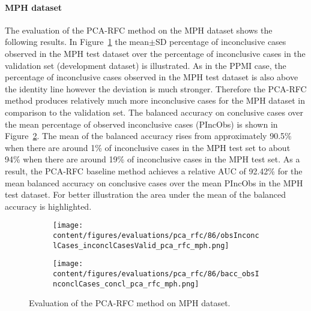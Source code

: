 
\paragraph{MPH dataset}

The evaluation of the PCA-RFC method on the MPH dataset shows the following results.
In Figure~\ref{fig:obsInconclCases_inconclCasesValid_pca_rfc_mph} 
the mean$\pm$SD percentage of inconclusive cases observed in the MPH test dataset 
over the percentage of inconclusive cases in the validation set (development dataset) is illustrated.
As in the PPMI case, the percentage of inconclusive cases observed in the MPH test dataset
is also above the identity line however the deviation is much stronger.
Therefore the PCA-RFC method produces relatively much more inconclusive cases for the MPH dataset  
in comparison to the validation set.
The balanced accuracy on conclusive cases over the mean percentage of observed inconclusive cases (PIncObs) is shown 
in Figure~\ref{fig:bacc_obsInconclCases_concl_pca_rfc_mph}.
The mean of the balanced accuracy rises from approximately 90.5\% 
when there are around 1\% of inconclusive cases in the MPH test set to about 94\% 
when there are around 19\% of inconclusive cases in the MPH test set.
As a result, the PCA-RFC baseline method achieves a relative AUC of 92.42\% for the mean balanced accuracy on conclusive cases 
over the mean PIncObs in the MPH test dataset.
For better illustration the area under the mean of the balanced accuracy is highlighted.


\begin{figure}[ht]
  \begin{subfigure}{0.9\textwidth}
    \centering
    \texttt{[image: content/figures/evaluations/pca\_rfc/86/obsInconclCases\_inconclCasesValid\_pca\_rfc\_mph.png]}
    \label{fig:obsInconclCases_inconclCasesValid_pca_rfc_mph}
  \end{subfigure}
  \hfill
  \begin{subfigure}{0.9\textwidth}
    \centering
    \texttt{[image: content/figures/evaluations/pca\_rfc/86/bacc\_obsInconclCases\_concl\_pca\_rfc\_mph.png]}
    \label{fig:bacc_obsInconclCases_concl_pca_rfc_mph}
  \end{subfigure}
  \caption{Evaluation of the PCA-RFC method on MPH dataset.}
  \label{fig:perf_results_rfc_mph}
\end{figure}


